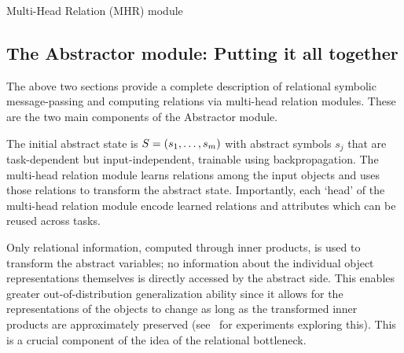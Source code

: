 \begin{algorithm}[ht!]
	\caption{Multi-Head Relation (MHR) module}\label{alg:multiheadrelation}

	\vspace{1em}

\end{algorithm}

\subsection{The Abstractor module: Putting it all together}

The above two sections provide a complete description of relational symbolic message-passing and computing relations via multi-head relation modules. These are the two main components of the Abstractor module.

The initial abstract state is $S = (s_1, \ldots, s_m)$ with abstract symbols $s_j$ that are task-dependent but input-independent, trainable using backpropagation. The multi-head relation module learns relations among the input objects and uses those relations to transform the abstract state. Importantly, each `head' of the multi-head relation module encode learned relations and attributes which can be reused across tasks.

Only relational information, computed through inner products, is used to transform the abstract variables; no information about the individual object representations themselves is directly accessed by the abstract side. This enables greater out-of-distribution generalization ability since it allows for the representations of the objects to change as long as the transformed inner products are approximately preserved (see~ for experiments exploring this). This is a crucial component of the idea of the relational bottleneck.

